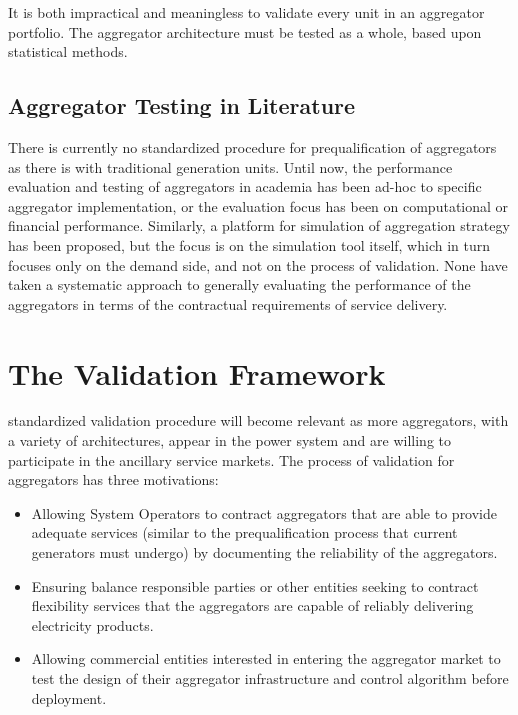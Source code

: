 It is both impractical and meaningless to validate every unit in an aggregator portfolio. The aggregator architecture must be tested as a whole, based upon statistical methods.

\subsection{Aggregator Testing in Literature}\label{subsec:aggtest}
There is currently no standardized procedure for prequalification of aggregators as there is with traditional generation units. Until now, the performance evaluation and testing of aggregators in academia has been ad-hoc to specific aggregator implementation, or the evaluation focus has been on computational or financial performance. Similarly, a platform for simulation of aggregation strategy has been proposed, but the focus is on the simulation tool itself, which in turn focuses only on the demand side, and not on the process of validation. None have taken a systematic approach to generally evaluating the performance of the aggregators in terms of the contractual requirements of service delivery.


\section{The Validation Framework}

 standardized validation procedure will become relevant as more aggregators, with a variety of architectures, appear in the power system and are willing to participate in the ancillary service markets. The process of validation for aggregators has three motivations: 
\begin{itemize}
	\item Allowing System Operators to contract aggregators that are able to provide adequate services (similar to the prequalification process that current generators must undergo) by documenting the reliability of the aggregators.
	\item Ensuring balance responsible parties or other entities seeking to contract flexibility services that the aggregators are capable of reliably delivering electricity products.
	\item Allowing commercial entities interested in entering the aggregator market to test the design of their aggregator infrastructure and control algorithm before deployment.
\end{itemize}

